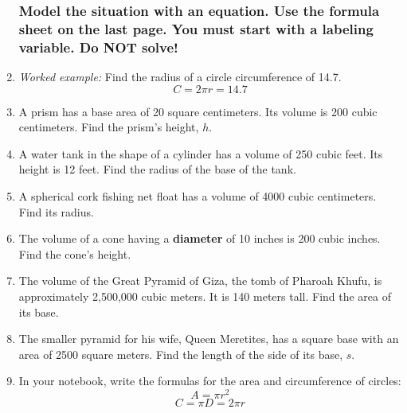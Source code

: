 \documentclass[12pt, twoside]{article}
\begin{document}
\begin{enumerate}
\newpage
\subsubsection*{Model the situation with an equation. Use the formula sheet on the last page. You must start with a labeling variable. \hfill Do NOT solve!}

\item \emph{Worked example:} Find the radius of a circle circumference of 14.7.
\[C=2\pi r=14.7\]

\item A prism has a base area of 20 square centimeters. Its volume is 200 cubic centimeters. Find the prism's height, $h$. \vspace{2cm}

\item A water tank in the shape of a cylinder has a volume of 250 cubic feet. Its height is 12 feet. Find the radius of the base of the tank. \vspace{2cm}

\item A spherical cork fishing net float has a volume of 4000 cubic centimeters. Find its radius. \vspace{2cm}

\item The volume of a cone having a \textbf{diameter} of 10 inches is 200 cubic inches. Find the cone's height. \vspace{2cm}

\item The volume of the Great Pyramid of Giza, the tomb of Pharoah Khufu, is approximately 2,500,000 cubic meters. It is 140 meters tall. Find the area of its base.  \vspace{2cm}

\item The smaller pyramid for his wife, Queen Meretites, has a square base with an area of 2500 square meters. Find the length of the side of its base, $s$.

\newpage
\item In your notebook, write the formulas for the area and circumference of circles:
\[A=\pi r^2\]
\[C=\pi D = 2\pi r\]


\end{enumerate}
\end{document}
